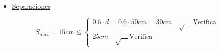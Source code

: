 \begin{enumerate}
\begin{itemize}
\item \underline{Separaciones}

\[ S_{max} = 15cm \leq \left\{ \begin{array}{ll}
         0.6 \cdot d = 0.6 \cdot 50cm = 30cm \quad \surd \quad \text{Verifica} & \\
         25cm \quad \surd \quad \text{Verifica} & \end{array} \right. \]
\end{itemize}
\end{enumerate}